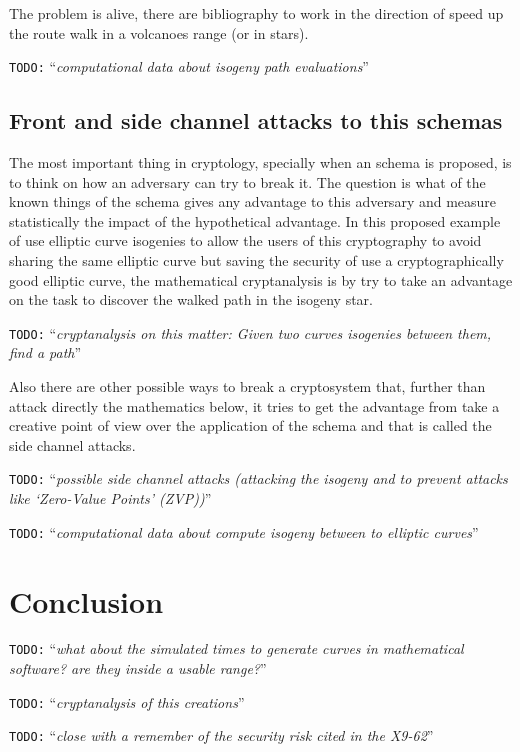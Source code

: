 \documentclass[10pt,a4paper,twoside]{llncs}
\newcommand{\todo}[1]{\texttt{\color{red}TODO:} ``\emph{#1}''}
\begin{document}
The problem is alive, there are bibliography \cite{SubExpIso} to work in the direction of speed up the route walk in a volcanoes range (or in stars). 

\todo{computational data about isogeny path evaluations}

\subsection{Front and side channel attacks to this schemas \label{sec:cryptanalysis}}

The most important thing in cryptology, specially when an schema is proposed, is to think on how an adversary can try to break it. The question is what of the known things of the schema gives any advantage to this adversary and measure statistically the impact of the hypothetical advantage. In this proposed example of use elliptic curve isogenies to allow the users of this cryptography to avoid sharing the same elliptic curve but saving the security of use a cryptographically good elliptic curve, the mathematical cryptanalysis is by try to take an advantage on the task to discover the walked path in the isogeny star.

\todo{cryptanalysis on this matter: Given two curves isogenies between them, find a path}\cite{FastBetweenIso}

Also there are other possible ways to break a cryptosystem that, further than attack directly the mathematics below, it tries to get the advantage from take a creative point of view over the application of the schema and that is called the side channel attacks.

\todo{possible side channel attacks (attacking the isogeny and to prevent attacks like `\emph{Zero-Value Points}' (ZVP))}

\todo{computational data about compute isogeny between to elliptic curves}

\section{Conclusion \label{sec:conclusion}}
\todo{what about the simulated times to generate curves in mathematical software? are they inside a usable range?}

\todo{cryptanalysis of this creations}

\todo{close with a remember of the security risk cited in the X9-62}
\end{document}
